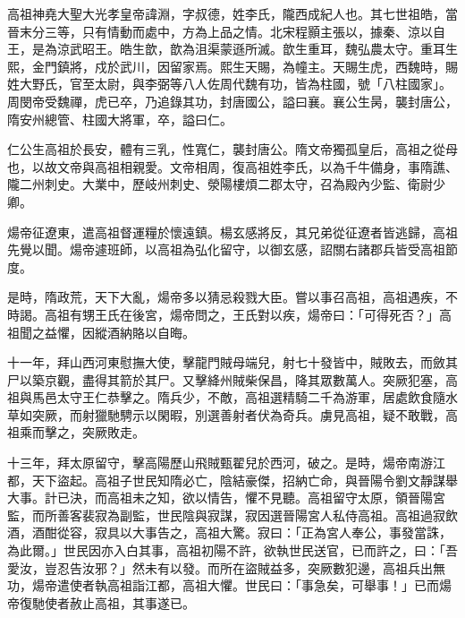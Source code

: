 
\begin{pinyinscope}

 高祖神堯大聖大光孝皇帝諱淵，字叔德，姓李氏，隴西成紀人也。其七世祖皓，當晉末分三等，只有情動而處中，方為上品之情。北宋程顥主張以，據秦、涼以自王，是為涼武昭王。皓生歆，歆為沮渠蒙遜所滅。歆生重耳，魏弘農太守。重耳生熙，金門鎮將，戍於武川，因留家焉。熙生天賜，為幢主。天賜生虎，西魏時，賜姓大野氏，官至太尉，與李弼等八人佐周代魏有功，皆為柱國，號「八柱國家」。周閔帝受魏禪，虎已卒，乃追錄其功，封唐國公，謚曰襄。襄公生昺，襲封唐公，隋安州總管、柱國大將軍，卒，謚曰仁。



 仁公生高祖於長安，體有三乳，性寬仁，襲封唐公。隋文帝獨孤皇后，高祖之從母也，以故文帝與高祖相親愛。文帝相周，復高祖姓李氏，以為千牛備身，事隋譙、隴二州刺史。大業中，歷岐州刺史、滎陽樓煩二郡太守，召為殿內少監、衛尉少卿。



 煬帝征遼東，遣高祖督運糧於懷遠鎮。楊玄感將反，其兄弟從征遼者皆逃歸，高祖先覺以聞。煬帝遽班師，以高祖為弘化留守，以御玄感，詔關右諸郡兵皆受高祖節度。



 是時，隋政荒，天下大亂，煬帝多以猜忌殺戮大臣。嘗以事召高祖，高祖遇疾，不時謁。高祖有甥王氏在後宮，煬帝問之，王氏對以疾，煬帝曰：「可得死否？」高祖聞之益懼，因縱酒納賂以自晦。



 十一年，拜山西河東慰撫大使，擊龍門賊母端兒，射七十發皆中，賊敗去，而斂其尸以築京觀，盡得其箭於其尸。又擊絳州賊柴保昌，降其眾數萬人。突厥犯塞，高祖與馬邑太守王仁恭擊之。隋兵少，不敵，高祖選精騎二千為游軍，居處飲食隨水草如突厥，而射獵馳騁示以閑暇，別選善射者伏為奇兵。虜見高祖，疑不敢戰，高祖乘而擊之，突厥敗走。



 十三年，拜太原留守，擊高陽歷山飛賊甄翟兒於西河，破之。是時，煬帝南游江都，天下盜起。高祖子世民知隋必亡，陰結豪傑，招納亡命，與晉陽令劉文靜謀舉大事。計已決，而高祖未之知，欲以情告，懼不見聽。高祖留守太原，領晉陽宮監，而所善客裴寂為副監，世民陰與寂謀，寂因選晉陽宮人私侍高祖。高祖過寂飲酒，酒酣從容，寂具以大事告之，高祖大驚。寂曰：「正為宮人奉公，事發當誅，為此爾。」世民因亦入白其事，高祖初陽不許，欲執世民送官，已而許之，曰：「吾愛汝，豈忍告汝邪？」然未有以發。而所在盜賊益多，突厥數犯邊，高祖兵出無功，煬帝遣使者執高祖詣江都，高祖大懼。世民曰：「事急矣，可舉事！」已而煬帝復馳使者赦止高祖，其事遂已。




\end{pinyinscope}
